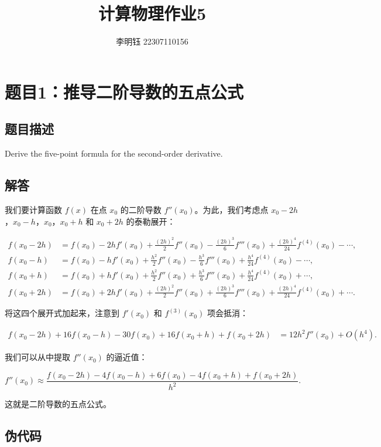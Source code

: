 \documentclass[11pt]{article}
\author{李明钰 22307110156}
\title{计算物理作业5}
\begin{document}
\maketitle


\section{题目1：推导二阶导数的五点公式}
\subsection{题目描述}
Derive the five-point formula for the second-order derivative.

\subsection{解答}
我们要计算函数 \( f(x) \) 在点 \( x_0 \) 的二阶导数 \( f''(x_0) \)。为此，我们考虑点 \( x_0 - 2h \)，\( x_0 - h \)，\( x_0 \)，\( x_0 + h \) 和 \( x_0 + 2h \) 的泰勒展开：

\[
\begin{aligned}
f(x_0 - 2h) & = f(x_0) - 2hf'(x_0) + \frac{(2h)^2}{2}f''(x_0) - \frac{(2h)^3}{6}f'''(x_0) + \frac{(2h)^4}{24}f^{(4)}(x_0) - \cdots, \\
f(x_0 - h) & = f(x_0) - hf'(x_0) + \frac{h^2}{2}f''(x_0) - \frac{h^3}{6}f'''(x_0) + \frac{h^4}{24}f^{(4)}(x_0) - \cdots, \\
f(x_0 + h) & = f(x_0) + hf'(x_0) + \frac{h^2}{2}f''(x_0) + \frac{h^3}{6}f'''(x_0) + \frac{h^4}{24}f^{(4)}(x_0) + \cdots, \\
f(x_0 + 2h) & = f(x_0) + 2hf'(x_0) + \frac{(2h)^2}{2}f''(x_0) + \frac{(2h)^3}{6}f'''(x_0) + \frac{(2h)^4}{24}f^{(4)}(x_0) + \cdots.
\end{aligned}
\]

将这四个展开式加起来，注意到 \( f'(x_0) \) 和 \( f^{(3)}(x_0) \) 项会抵消：

\[
\begin{aligned}
f(x_0 - 2h) + 16f(x_0 - h) - 30f(x_0) + 16f(x_0 + h) + f(x_0 + 2h) &= 12h^2 f''(x_0) + O(h^4).
\end{aligned}
\]

我们可以从中提取 \( f''(x_0) \) 的逼近值：

\[
f''(x_0) \approx \frac{f(x_0 - 2h) - 4f(x_0 - h) + 6f(x_0) - 4f(x_0 + h) + f(x_0 + 2h)}{h^2}.
\]

这就是二阶导数的五点公式。

\subsection{伪代码}
\end{document}
